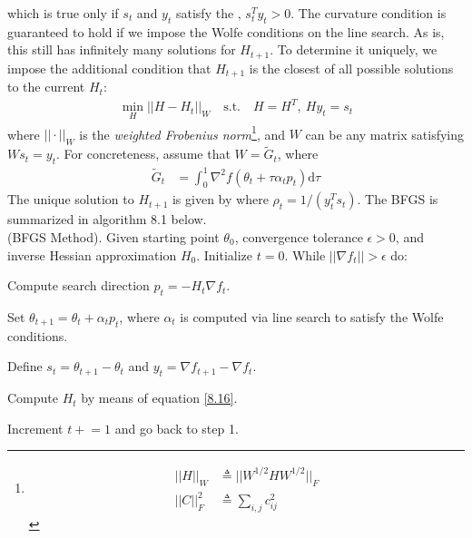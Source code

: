 \documentclass[11pt]{article}
\begin{document}
which is true only if $s_t$ and $y_t$ satisfy the , $s_t^T y_t > 0$. The curvature condition is guaranteed to hold if we impose the Wolfe conditions on the line search. As is, this still has infinitely many solutions for $H_{t + 1}$. To determine it uniquely, we impose the additional condition that $H_{t + 1}$ is the closest of all possible solutions to the current $H_t$:
\begin{align}
	\min_H || H - H_t ||_W \quad \text{s.t.} \quad H=H^T, ~ Hy_t=s_t
\end{align}
where $||\cdot||_W$ is the \textit{weighted Frobenius norm}\footnote{
	\begin{align}
		|| H ||_W &\triangleq || W^{1/2} H W^{1/2} ||_F \\
		|| C ||_F^2 &\triangleq \sum_{i,j} c_{ij}^2
	\end{align}
}, and $W$ can be any matrix satisfying $W s_t = y_t$. For concreteness, assume that $W = \widetilde{G}_t$, where
\begin{align}
	\widetilde{G}_t &= \int_0^1 \nabla^2 f(\theta_t + \tau \alpha_t p_t) \mathrm{d}\tau 
\end{align}
The unique solution to $H_{t + 1}$ is given by 
where $\rho_t = 1 / (y_t^Ts_t)$. The BFGS is summarized in algorithm 8.1 below. \\

 (BFGS Method). Given starting point $\theta_0$, convergence tolerance $\epsilon > 0$, and inverse Hessian approximation $H_0$. Initialize $t = 0$. While $|| \nabla f_t || > \epsilon$ do:
\begin{compactenum}
	\item Compute search direction $p_t = -H_t \nabla f_t$. 
	
	\item Set $\theta_{t + 1} = \theta_t + \alpha_t p_t$, where $\alpha_t$ is computed via line search to satisfy the Wolfe conditions. 
	
	\item Define $s_t = \theta_{t + 1} - \theta_t$ and $y_t = \nabla f_{t + 1} - \nabla f_t$. 
	
	\item Compute $H_t$ by means of equation \ref{8.16}. 
	
	\item Increment $t \mathrel{+}=  1$ and go back to step 1. 
\end{compactenum}
\end{document}
